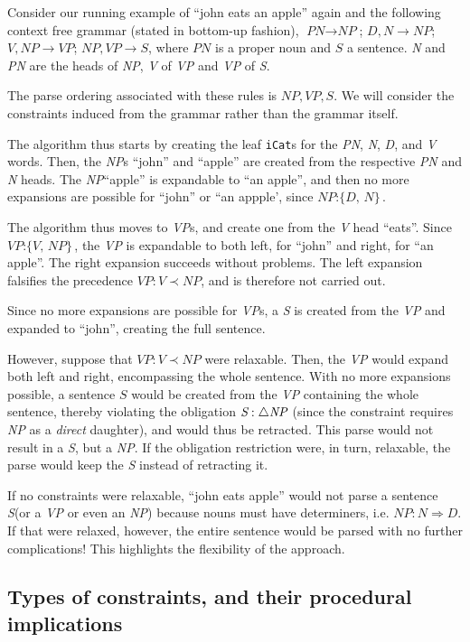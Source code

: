 \documentclass{llncs}
\newcommand{\constituency}[2]{\textit{#1} : \textit{#2}}
\newcommand{\obligation}[2]{\textit{#1} : \triangle \textit{#2}}
\newcommand{\precedence}[3]{\textit{#1} : \textit{#2} \prec \textit{#3}}
\newcommand{\requirement}[3]{\textit{#1} : \textit{#2} \Rightarrow \textit{#3}}
\newcommand{\PN}{\textit{PN}\xspace}
\newcommand{\NP}{\textit{NP}\xspace}
\newcommand{\VP}{\textit{VP}\xspace}
\newcommand{\Se}{\textit{S}\xspace}
\newcommand{\N}{\textit{N}\xspace}
\newcommand{\V}{\textit{V}\xspace}
\newcommand{\D}{\textit{D}\xspace}
\begin{document}
\begin{example}
  Consider our running example of ``john eats an apple'' again and the following context free grammar (stated in bottom-up fashion), $\PN \to \NP$; $D, N \to \NP$; $V,\NP \to \VP$; $NP, \VP \to S$, where $\PN$ is a proper noun and $S$ a sentence. \N and \PN are the heads of \NP, \V of \VP and \VP of \Se.
  
  The parse ordering associated with these rules is $\NP,\VP,\Se$. We will consider the constraints induced from the grammar rather than the grammar itself.

The algorithm thus starts by creating the leaf \texttt{iCat}s for the \PN, \N, \D, and \V words. Then, the \NP{}s ``john'' and ``apple'' are created from the respective \PN and \N heads. The \NP ``apple'' is expandable to ``an apple'', and then no more expansions are possible for ``john'' or ``an appple', since $\constituency{NP}{\{D, N\}}$.

The algorithm thus moves to \VP{}s, and create one from the \V head ``eats''. Since $\constituency{VP}{\{V, NP\}}$, the \VP is expandable to both left, for ``john'' and right, for ``an apple''. The right expansion succeeds without problems. The left expansion falsifies the precedence $\precedence{VP}{V}{NP}$, and is therefore not carried out.

Since no more expansions are possible for \VP{}s, a \Se is created from the \VP and expanded to ``john'', creating the full sentence.

However, suppose that $\precedence{VP}{V}{NP}$ were relaxable. Then, the \VP would expand both left and right, encompassing the whole sentence. With no more expansions possible, a sentence $S$ would be created from the \VP containing the whole sentence, thereby violating the obligation $\obligation{\Se}{\NP}$ (since the constraint requires \NP as a \emph{direct} daughter), and would thus be retracted. This parse would not result in a \Se, but a \NP. If the obligation restriction were, in turn, relaxable, the parse would keep the \Se instead of retracting it.

If no constraints were relaxable, ``john eats apple'' would not parse a sentence \Se (or a \VP or even an \NP) because nouns must have determiners, i.e. $\requirement{NP}{N}{D}$. If that were relaxed, however, the entire sentence would be parsed with no further complications! This highlights the flexibility of the approach.
\end{example}

\subsection{Types of constraints, and their procedural implications}
\label{ssec:constrs}
\end{document}
